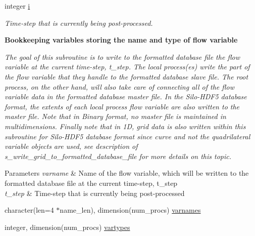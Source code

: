\textbf{ }\par
\begin{DoxyCompactItemize}
\item 
integer \hyperlink{m__data__output_8f90_aaea4baed8fd8b780f6938f0dc1fb0f72}{i}
\begin{DoxyCompactList}\small\item\em Time-\/step that is currently being post-\/processed. \end{DoxyCompactList}\end{DoxyCompactItemize}

\begin{Indent}\textbf{ Bookkeeping variables storing the name and type of flow variable}\par
{\em The goal of this subroutine is to write to the formatted database file the flow variable at the current time-\/step, t\+\_\+step. The local process(es) write the part of the flow variable that they handle to the formatted database slave file. The root process, on the other hand, will also take care of connecting all of the flow variable data in the formatted database master file. In the Silo-\/\+H\+D\+F5 database format, the extents of each local process flow variable are also written to the master file. Note that in Binary format, no master file is maintained in multidimensions. Finally note that in 1D, grid data is also written within this subroutine for Silo-\/\+H\+D\+F5 database format since curve and not the quadrilateral variable objects are used, see description of s\+\_\+write\+\_\+grid\+\_\+to\+\_\+formatted\+\_\+database\+\_\+file for more details on this topic.


\begin{DoxyParams}{Parameters}
{\em varname} & Name of the flow variable, which will be written to the formatted database file at the current time-\/step, t\+\_\+step \\
\hline
{\em t\+\_\+step} & Time-\/step that is currently being post-\/processed \\
\hline
\end{DoxyParams}
}\begin{DoxyCompactItemize}
\item 
character(len=4 $\ast$name\+\_\+len), dimension(num\+\_\+procs) \hyperlink{m__data__output_8f90_abef5dbfec3461a8726fd983ab5e7afb8}{varnames}
\item 
integer, dimension(num\+\_\+procs) \hyperlink{m__data__output_8f90_a36cb070ec6a82e3a699ac20c28f1138e}{vartypes}
\end{DoxyCompactItemize}
\end{Indent}
